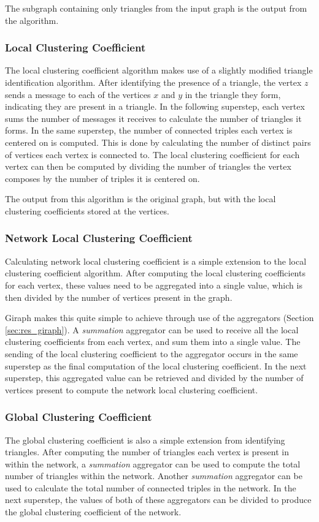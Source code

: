 The subgraph containing only triangles from the input graph is the output from the algorithm.

\subsubsection{Local Clustering Coefficient}
The local clustering coefficient algorithm makes use of a slightly modified triangle identification algorithm. After identifying the presence of a triangle, the vertex $z$ sends a message to each of the vertices $x$ and $y$ in the triangle they form, indicating they are present in a triangle. In the following superstep, each vertex sums the number of messages it receives to calculate the number of triangles it forms. In the same superstep, the number of connected triples each vertex is centered on is computed. This is done by calculating the number of distinct pairs of vertices each vertex is connected to. The local clustering coefficient for each vertex can then be computed by dividing the number of triangles the vertex composes by the number of triples it is centered on.

The output from this algorithm is the original graph, but with the local clustering coefficients stored at the vertices.

\subsubsection{Network Local Clustering Coefficient}
Calculating network local clustering coefficient is a simple extension to the local clustering coefficient algorithm. After computing the local clustering coefficients for each vertex, these values need to be aggregated into a single value, which is then divided by the number of vertices present in the graph.

Giraph makes this quite simple to achieve through use of the aggregators (Section \ref{sec:res_giraph}). A \emph{summation} aggregator can be used to receive all the local clustering coefficients from each vertex, and sum them into a single value. The sending of the local clustering coefficient to the aggregator occurs in the same superstep as the final computation of the local clustering coefficient. In the next superstep, this aggregated value can be retrieved and divided by the number of vertices present to compute the network local clustering coefficient.

\subsubsection{Global Clustering Coefficient}
The global clustering coefficient is also a simple extension from identifying triangles. After computing the number of triangles each vertex is present in within the network, a \emph{summation} aggregator can be used to compute the total number of triangles within the network. Another \emph{summation} aggregator can be used to calculate the total number of connected triples in the network. In the next superstep, the values of both of these aggregators can be divided to produce the global clustering coefficient of the network.

